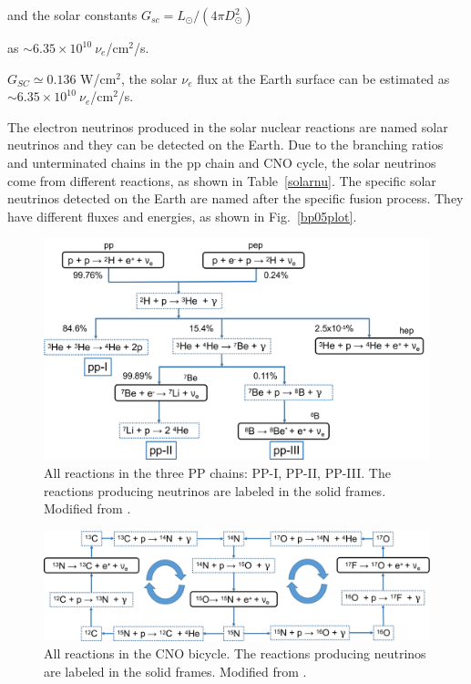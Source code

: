 and the solar constants $G_{sc}=L_\odot/(4\pi D^2_\odot)$

as $\sim 6.35\times 10^{10}~\nu_e$/cm$^2$/s\cite{suekane2015neutrino}. 




$G_{SC}\simeq 0.136$ W/cm$^2$, the solar $\nu_e$ flux at the Earth surface can be estimated as $\sim 6.35\times 10^{10}~\nu_e$/cm$^2$/s\cite{suekane2015neutrino}. 

The electron neutrinos produced in the solar nuclear reactions are named solar neutrinos and they can be detected on the Earth. Due to the branching ratios and unterminated chains in the pp chain and CNO cycle, the solar neutrinos come from different reactions, as shown in Table~\ref{solarnu}. The specific solar neutrinos detected on the Earth are named after the specific fusion process\cite{haxton2013solar}. They have different fluxes and energies, as shown in Fig.~\ref{bp05plot}\cite{bahcall2005new}.

\begin{figure}[htbp]
	\centering	
	\includegraphics[width=14cm]{ppChain.png}
	\caption{All reactions in the three PP chains: PP-I, PP-II, PP-III. The reactions producing neutrinos are labeled in the solid frames. Modified from \cite{oberauer2020solar}.}
	\label{ppChain}
\end{figure}

\begin{figure}[htbp]
	\centering	
	\includegraphics[width=14cm]{CNOcycle.png}
	\caption{All reactions in the CNO bicycle. The reactions producing neutrinos are labeled in the solid frames. Modified from \cite{oberauer2020solar}.}
	\label{CNOcycle}
\end{figure}

